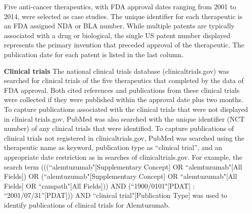 \documentclass[10pt,letterpaper]{article}
\newlength\savedwidth
\newcommand\thickhline{\noalign{\global\savedwidth\arrayrulewidth\global\arrayrulewidth 2pt}%
\hline
\noalign{\global\arrayrulewidth\savedwidth}}
\begin{document}
\begin{table}[!ht]
\begin{adjustwidth}{-0.5in}{0in} %
\centering
\caption{
\textbf{Case Studies of Five Anti-Cancer Agents}}
\vspace{2.5 mm}
\begin {flushleft} Five anti-cancer therapeutics, with FDA approval dates ranging from 2001 to 2014, were selected as case studies. The unique identifier for each therapeutic is an FDA assigned NDA or BLA number. While multiple patents are typically associated with a drug or biological, the single US patent number displayed represents the primary invention that preceded approval of the therapeutic. The publication date for each patent is listed in the last column.
\end{flushleft}
\label{table1}
\end{adjustwidth}
\end{table}

\textbf{Clinical trials} The national clinical trials database (clinicaltrials.gov) was searched for clinical trials of the five therapeutics that completed by the data of FDA approval. Both cited references and publications from these clinical trials were collected if they were published within the approval date plus two months. To capture publications associated with the clinical trials that were not displayed in clinical trials.gov, PubMed was also searched with the unique identifier (NCT number) of any clinical trials that were identified. To capture publications of clinical trials not registered in clinicaltrials.gov, PubMed was searched using the therapeutic name as keyword, publication type as ``clinical trial'', and an appropriate date restriction as in searches of clinicaltrials.gov. For example, the search term (((``alemtuzumab"[Supplementary Concept] OR ``alemtuzumab"[All Fields]) OR (``alemtuzumab"[Supplementary Concept] OR ``alemtuzumab"[All Fields] OR ``campath"[All Fields])) AND (``1900/0101"[PDAT] : ``2001/07/31''[PDAT])) AND ``clinical trial"[Publication Type] was used to identify publications of clinical trials for Alemtuzumab.
\end{document}

